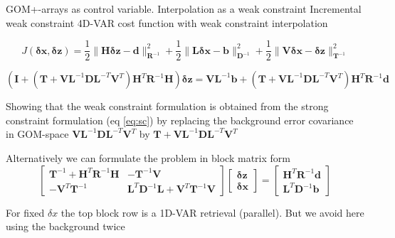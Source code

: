 \documentclass[9pt]{beamer}
\newcommand{\op}[1]{\mathrm{\mathbf{#1}}}
\renewcommand{\vec}[1]{\mathrm{\mathbf{#1}}}
\begin{document}
\begin{frame}{GOM+-arrays as control variable. Interpolation as a weak constraint}
Incremental weak constraint 4D-VAR cost function with weak constraint interpolation

\begin{equation}
  J(\vec{\delta x},\vec{\delta z}) = \frac{1}{2}\|\op{H}\vec{\delta z}-\vec{d}\|^2_{\op{R}^{-1}} + \frac{1}{2} \|\op{L}\vec{\delta x} - \vec{b}\|^2_{\op{D}^{-1}} + \frac{1}{2}\|\op{V}\vec{\delta x} - \vec{\delta z}\|^2_{\op{T}^{-1}}
\end{equation}

\begin{equation}\label{eq:wc} 
    ( \op{I}+  (\op{T} + \op{V} \op{L}^{-1}   \op{D} \op{L}^{-T}  \op{V}^T )  \op{H}^{T} \op{R}^{-1} \op{H} )\vec{\delta z}  =   \op{V} \op{L}^{-1} \vec{b}  +  (\op{T} + \op{V} \op{L}^{-1}   \op{D} \op{L}^{-T}  \op{V}^T)\op{H}^{T}  \op{R}^{-1} \vec{d} 
  \end{equation} 

  Showing that the weak constraint formulation is obtained from the strong constraint formulation (eq \eqref{eq:sc}) by replacing the background error covariance in GOM-space  $\op{V} \op{L}^{-1}   \op{D} \op{L}^{-T}  \op{V}^T $ by  $\op{T} + \op{V} \op{L}^{-1}   \op{D} \op{L}^{-T}  \op{V}^T$   


Alternatively we can formulate the problem in block matrix form 
$$ \begin{bmatrix} 
    \op{T}^{-1} + \op{H}^T \op{R}^{-1}\op{H} & -\op{T}^{-1} \op{V} \\ 
                 -\op{V}^T \op{T}^{-1}  &  \op{L}^T \op{D}^{-1}\op{L} + \op{V}^T \op{T}^{-1} \op{V} 
  \end{bmatrix} 
  \begin{bmatrix} 
    \vec{\delta z} \\
    \vec{\delta x} 
  \end{bmatrix} 
  = 
  \begin{bmatrix} 
    \op{H}^T \op{R}^{-1} \vec{d} \\ 
     \op{L}^T \op{D}^{-1} \vec{b} 
    \end{bmatrix} $$

For fixed $\delta x$ the top block row is a 1D-VAR retrieval (parallel). But we avoid here using the background twice   

\end{frame}
\end{document}
